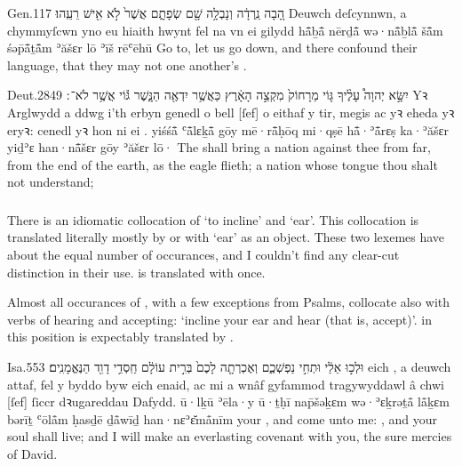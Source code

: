 \begin{example}{Gen.}{11}{7}{}{}
	\quoling
	{הָ֚בָה נֵֽרְדָ֔ה וְנָבְלָ֥ה שָׁ֖ם שְׂפָתָ֑ם אֲשֶׁר֙ לֹ֣א  אִ֖ישׁ  רֵעֵֽהוּ׃}
	{Deuwch deſcynnwn, a chymmyſcwn yno eu hiaith hwynt fel na  vn  ei gilydd}
	{hå̄̄ḇå̄̄ nērḏå̄̄ wə·nå̄̄ḇlå̄̄ šå̄̄m śəp̄å̄̄ṯå̄̄m ʾăšɛr lō  ʾīš  rēʿēhū}
	{Go to, let us go down, and there confound their language, that they may not  one another's .}
\end{example}

\begin{example}{Deut.}{28}{49}{}{}
	\quoling
	{יִשָּׂ֣א יְהוָה֩ עָלֶ֨יךָ גּ֤וֹי מֵרָחוֹק֙ מִקְצֵ֣ה הָאָ֔רֶץ כַּאֲשֶׁ֥ר יִדְאֶ֖ה הַנָּ֑שֶׁר גּ֕וֹי אֲשֶׁ֥ר לֹא־ ׃}
	{Yꝛ Arglwydd a ddwg i'th erbyn genedl o bell [ſef] o eithaf y tir, megis ac yꝛ eheda yꝛ eryꝛ: cenedl yꝛ hon ni  ei .}
	{yiśśå̄̄ {\YHWH} ʿå̄̄lɛḵå̄̄ gōy mē·rå̄̄ḥōq mi·qṣē hå̄̄·ʾå̄̄rɛṣ ka·ʾăšɛr yiḏʾɛ han·nå̄̄šɛr gōy ʾăšɛr lō· }
	{The {\LORD} shall bring a nation against thee from far, from the end of the earth,  as the eagle flieth; a nation whose tongue thou shalt not understand;}
\end{example}



\subsubsection{}


\begin{paper}
	There is an idiomatic collocation of  ‘to incline’ and  ‘ear’. This collocation is translated literally mostly by  or  with  ‘ear’ as an object. These two lexemes have about the equal number of occurances, and I couldn’t find any clear-cut distinction in their use.  is translated with  once.

	Almost all occurances of , with a few exceptions from Psalms, collocate also with verbs of hearing and accepting: ‘incline your ear and hear (that is, accept)’.  in this position is expectably translated by .
\end{paper}

\begin{example}{Isa.}{55}{3}{}{}
	\quoling
	{  וּלְכ֣וּ אֵלַ֔י  וּתְחִ֣י נַפְשְׁכֶ֑ם וְאֶכְרְתָ֤ה לָכֶם֙ בְּרִ֣ית עוֹלָ֔ם חַֽסְדֵ֥י דָוִ֖ד הַנֶּאֱמָנִֽים׃}
	{ eich , a deuwch attaf,  fel y byddo byw eich enaid, ac mi a wnâf gyfammod tragywyddawl â chwi [ſef] ſiccr dꝛugareddau Dafydd.}
	{  ū·lḵū ʾēla·y  ū·ṯḥī nap̄šəḵɛm wə·ʾɛḵrəṯå̄ lå̄ḵɛm bərīṯ ʿōlå̄m ḥasḏē ḏå̄wīḏ han·nɛʾɛ̆må̄nīm}
	{ your , and come unto me: , and your soul shall live; and I will make an everlasting covenant with you,  the sure mercies of David.}
\end{example}

